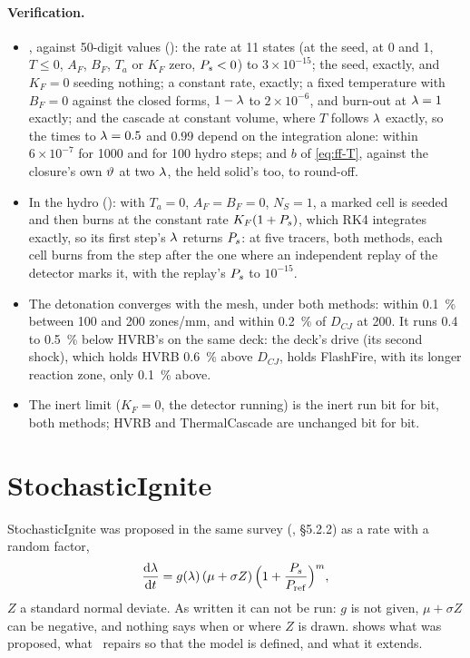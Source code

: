 \paragraph{Verification.}
\begin{itemize}
\item {}, against 50-digit values ():
  the rate at 11 states (at the seed, at 0 and 1, $T \le 0$, $A_F$, $B_F$,
  $T_a$ or $K_F$ zero, $P_{s} < 0$) to $3\times10^{-15}$; the seed, exactly, and
  $K_F = 0$ seeding nothing; a constant rate, exactly; a fixed temperature
  with $B_F = 0$ against the closed forms, $1 - \lambda$ to $2\times10^{-6}$,
  and burn-out at $\lambda = 1$ exactly; and the cascade at constant volume,
  where $T$ follows $\lambda$ exactly, so the times to $\lambda = 0.5$ and $0.99$
  depend on the integration alone: within $6\times10^{-7}$ for 1000 and for
  100 hydro steps; and $b$ of \cref{eq:ff-T}, against the closure's own
  $\vartheta$ at two $\lambda$, the held solid's too, to round-off.
\item In the hydro (): with $T_a =
  0$, $A_F = B_F = 0$, $N_S = 1$, a marked cell is seeded and then burns at
  the constant rate $K_F(1 + P_{s})$, which RK4 integrates exactly, so its
  first step's $\lambda$ returns $P_{s}$: at five tracers, both methods, each cell
  burns from the step after the one where an independent replay of the
  detector marks it, with the replay's $P_{s}$ to $10^{-15}$.
\item The detonation converges with the mesh, under both methods: within
  0.1~\% between 100 and 200 zones/mm, and within 0.2~\% of $D_{CJ}$ at 200.
  It runs 0.4 to 0.5~\% below HVRB's on the same deck: the deck's drive (its
  second shock), which holds HVRB 0.6~\% above $D_{CJ}$, holds FlashFire,
  with its longer reaction zone, only 0.1~\% above.
\item The inert limit ($K_F = 0$, the detector running) is the inert run bit
  for bit, both methods; HVRB and ThermalCascade are unchanged bit for bit.
\end{itemize}

\section{StochasticIgnite}
\label{sec:stochasticignite}

StochasticIgnite was proposed in the same survey (\cite{kittell2025sand},
\S 5.2.2) as a rate with a random factor,
\begin{equation*}
  \frac{\mathrm{d}\lambda}{\mathrm{d} t} = g(\lambda)\,(\mu + \sigma Z)\,
  \Bigl(1 + \frac{P_{s}}{P_{\mathrm{ref}}}\Bigr)^{m},
\end{equation*}
$Z$ a standard normal deviate. As written it can not be run: $g$ is not
given, $\mu + \sigma Z$ can be negative, and nothing says when or where $Z$
is drawn.  shows what was proposed, what \bw\ repairs so
that the model is defined, and what it extends.

